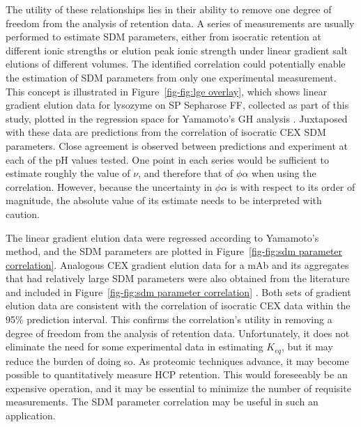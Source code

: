 \documentclass[preprint,review,12pt]{elsarticle}
\begin{document}
        The utility of these relationships lies in their ability to remove one degree of freedom from the analysis of retention data. A series of measurements are usually performed to estimate SDM parameters, either from isocratic retention at different ionic strengths or elution peak ionic strength under linear gradient salt elutions of different volumes. The identified correlation could potentially enable the estimation of SDM parameters from only one experimental measurement. This concept is illustrated in Figure~\ref{fig-fig:lge overlay}, which shows linear gradient elution data for lysozyme on SP Sepharose FF, collected as part of this study, plotted in the regression space for Yamamoto's GH analysis \cite{Yamamoto1987}. Juxtaposed with these data are predictions from the correlation of isocratic CEX SDM parameters. Close agreement is observed between predictions and experiment at each of the pH values tested. One point in each series would be sufficient to estimate roughly the value of $\nu$, and therefore that of $\phi \alpha$ when using the correlation. However, because the uncertainty in $\phi \alpha$ is with respect to its order of magnitude, the absolute value of its estimate needs to be interpreted with caution.


        The linear gradient elution data were regressed according to Yamamoto's method, and the SDM parameters are plotted in Figure~\ref{fig-fig:sdm parameter correlation}. Analogous CEX gradient elution data for a mAb and its aggregates that had relatively large SDM parameters were also obtained from the literature and included in Figure~\ref{fig-fig:sdm parameter correlation} \cite{Saleh2020}. Both sets of gradient elution data are consistent with the correlation of isocratic CEX data within the 95\% prediction interval. This confirms the correlation's utility in removing a degree of freedom from the analysis of retention data. Unfortunately, it does not eliminate the need for some experimental data in estimating $K_{eq}$, but it may reduce the burden of doing so. As proteomic techniques advance, it may become possible to quantitatively measure HCP retention. This would foreseeably be an expensive operation, and it may be essential to minimize the number of requisite measurements. The SDM parameter correlation may be useful in such an application.
\end{document}
